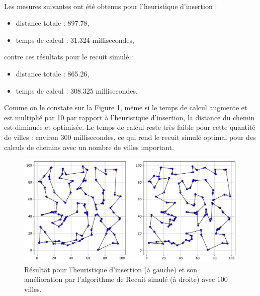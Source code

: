 \documentclass[a4paper,11pt,fleqn]{article}
\begin{document}
\paragraph{}
Les mesures suivantes ont été obtenus pour l'heuristique d'insertion : 
\begin{itemize}[noitemsep,topsep=5pt]
    \item distance totale : 897.78,
    \item temps de calcul : 31.324 millisecondes,
\end{itemize} 
contre ces résultats pour le recuit simulé :
\begin{itemize}[noitemsep,topsep=5pt]
    \item distance totale : 865.26,
    \item temps de calcul : 308.325 millisecondes.
\end{itemize}
Comme on le constate sur la Figure \ref{fig:recuit}, même si le temps de calcul augmente et est multiplié par 10 par rapport à l'heuristique d'insertion, la distance du chemin est diminuée et optimisée. Le temps de calcul reste très faible pour cette quantité de villes : environ 300 millisecondes, ce qui rend le recuit simulé optimal pour des calculs de chemins avec un nombre de villes important.
\begin{figure}[H]
    \centering
    \includegraphics[width=\textwidth]{images/recuit_simule.pdf}
    \caption{Résultat pour l'heuristique d'insertion (à gauche) et son amélioration par l'algorithme de Recuit simulé (à droite) avec 100 villes.}
    \label{fig:recuit}
\end{figure}
\end{document}
